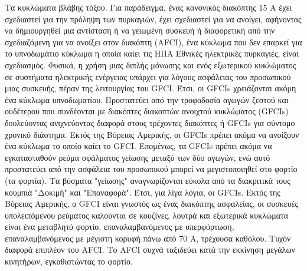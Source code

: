 \documentclass[11pt,a4paper,notitlepage,fleqn]{article}
\begin{document}
Τα κυκλώματα βλάβης τόξου. Για παράδειγμα, ένας κανονικός διακόπτης 15 A έχει σχεδιαστεί για την πρόληψη των πυρκαγιών, έχει σχεδιαστεί για να ανοίγει, αφήνοντας να δημιουργηθεί μια αντίσταση ή να γειωμένη συσκευή ή διαφορετική από την σχεδιαζόμενη για να ανοίξει στον διακόπτη (AFCI), ένα κύκλωμα που δεν επαρκεί για το υπνοδωμάτιο κύκλωμα η οποία καίει τις ΗΠΑ Εθνικές ηλεκτρικές πυρκαγιές, είναι σχεδιασμός. Φυσικά, η χρήση μιας διπλής μόνωσης και ενός εξωτερικού κυκλώματος σε συστήματα ηλεκτρικής ενέργειας υπάρχει για λόγους ασφάλειας του προσωπικού μιας συσκευής, πέραν της λειτουργίας του GFCI. Έτσι, οι GFCIs χρειάζονται ακόμη ένα κύκλωμα υπνοδωματίου. Προστατεύει από την τροφοδοσία αγωγών ζεστού και ουδέτερου που συνδέονται με διακόπτες διακοπτών ανοιχτού κυκλώματος (GFCIs) δουλεύοντας ανιχνεύοντας διαφορά στους τρέχοντες διακόπτες ή GFCIs για σύντομο χρονικό διάστημα. Εκτός της Βόρειας Αμερικής, οι GFCIs πρέπει ακόμα να ανοίξουν ένα κύκλωμα το οποίο καίει το GFCI. Επομένως, τα GFCIs πρέπει ακόμα να εγκατασταθούν ρεύμα σφάλματος γείωσης μεταξύ των δύο αγωγών, ενώ αυτό προστατεύει από την ασφάλεια του προσωπικού μπορεί να μεγιστοποιηθεί στο φορτίο (τα φορτία).
Τα βύσματα "γείωσης" αναγνωρίζονται εύκολα από τα διακριτικά τους κουμπιά "Δοκιμή" και "Επαναφορά". Έτσι, για λίγα λόγια, οι GFCIs. Εκτός της Βόρειας Αμερικής, ο GFCI είναι γνωστός ως ένας διακόπτης ασφαλείας, οι συσκευές υπολειπόμενου ρεύματος καλούνται σε κουζίνες, λουτρά και εξωτερικά κυκλώματα είναι ένα μεταβλητό φορτίο, επαναλαμβανόμενος με υπερφόρτωση, επαναλαμβανόμενος με μέγιστη κορυφή πάνω από 70 Α, τρέχουσα καθόλου. Τυχόν διαφορά επιπλέον του AFCI. Το AFCI συχνά ταξιδεύει κατά την εκκίνηση μεγάλων κινητήρων, εγκαθιστώντας το φορτίο. 
\end{document}
